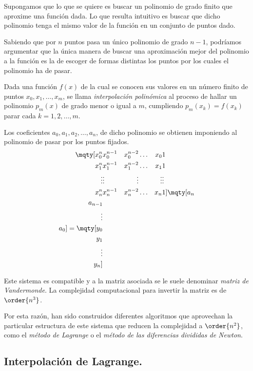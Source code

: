 Supongamos que lo que se quiere es buscar un polinomio de grado finito que aproxime una función dada. Lo que resulta intuitivo es buscar que dicho polinomio tenga el mismo valor de la función en un conjunto de puntos dado.
\par
Sabiendo que por $n$ puntos pasa un único polinomio de grado $n-1$, podríamos argumentar que la única manera de buscar una aproximación mejor del polinomio a la función es la de escoger de formas distintas los puntos por los cuales el polinomio ha de pasar.
\par
Dada una función $f(x)$ de la cual se conocen sus valores en un número finito de puntos $x_{0}, x_{1}, \ldots, x_{m}$, se llama \emph{interpolación polinómica} al proceso de hallar un polinomio $p_{m}(x)$ de grado menor o igual a $m$, cumpliendo $p_{m}(x_{k}) = f(x_{k})$ parar cada $k = 1, 2, \ldots, m$.
\par
Los coeficientes $a_{0}, a_{1}, a_{2}, \ldots, a_{n}$, de dicho polinomio se obtienen imponiendo al polinomio de pasar por los puntos fijados.
\begin{align*}
\mqty[
x_{0}^{n} & x_{0}^{n-1} & x_{0}^{n-2} & \ldots & x_{0} & 1 \\
x_{1}^{n} & x_{1}^{n-1} & x_{1}^{n-2} & \ldots & x_{1} & 1 \\
\vdots & \vdots & \vdots & & \vdots & \vdots \\
x_{n}^{n} & x_{n}^{n-1} & x_{n}^{n-2} & \ldots & x_{n} & 1 
]
\mqty[
a_{n} \\ a_{n-1} \\ \vdots \\ a_{0}
]
=
\mqty[
y_{0} \\ y_{1} \\ \vdots \\ y_{n}
]
\end{align*}

Este sistema es compatible y a la matriz asociada se le suele denominar \emph{matriz de Vandermonde}. La complejidad computacional para invertir la matriz es de $\order{n^{3}}$.
\par
Por esta razón, han sido construidos diferentes algoritmos que aprovechan la particular estructura de este sistema que reducen la complejidad a $\order{n^{2}}$, como el \emph{método de Lagrange} o el \emph{método de las diferencias divididas de Newton}.

\subsection{Interpolación de Lagrange.}

